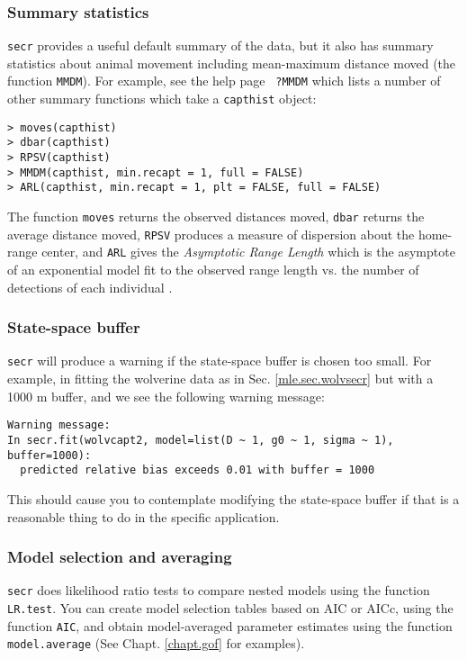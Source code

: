 \subsubsection{Summary statistics} 
\mbox{\tt secr} provides a useful default summary of the data, but it
also has summary statistics about animal movement including
mean-maximum distance moved (the function \mbox{\tt MMDM}). For example, see the help page \mbox{\tt
  ?MMDM} which lists a number of other summary functions which take a
\mbox{\tt capthist} object:
\begin{verbatim}
> moves(capthist)
> dbar(capthist)
> RPSV(capthist)
> MMDM(capthist, min.recapt = 1, full = FALSE)
> ARL(capthist, min.recapt = 1, plt = FALSE, full = FALSE)
\end{verbatim}
The function \mbox{\tt moves} returns the observed distances moved,
\mbox{\tt dbar} returns the average distance moved, 
\mbox{\tt RPSV} produces a measure of dispersion about the home-range
center, 
and \mbox{\tt ARL} gives the {\it 
Asymptotic Range Length} which is the asymptote of an exponential
model fit to the observed range length vs. the number of
detections of each individual 
\citep{jett_nichols:1987}.




\subsubsection{State-space buffer}
\mbox{\tt secr} 
will produce a warning if the state-space buffer is chosen too
small. For example, in fitting the wolverine data as in
Sec. \ref{mle.sec.wolvsecr} but with a 1000 m buffer, 
and we see the following warning message:
{\small
\begin{verbatim}
Warning message:
In secr.fit(wolvcapt2, model=list(D ~ 1, g0 ~ 1, sigma ~ 1), buffer=1000):
  predicted relative bias exceeds 0.01 with buffer = 1000
\end{verbatim}
}
{\flushleft This} should cause you to contemplate modifying the state-space buffer
if that is a reasonable thing to do in the specific application.


\subsubsection{Model selection and averaging}
\mbox{\tt secr} does likelihood ratio tests to compare nested models
using the function \mbox{\tt LR.test}.  You can create model selection
tables based on AIC or AICc, using the function \mbox{\tt AIC}, and obtain model-averaged parameter
estimates using the function \mbox{\tt model.average} (See Chapt. \ref{chapt.gof}
for examples).


